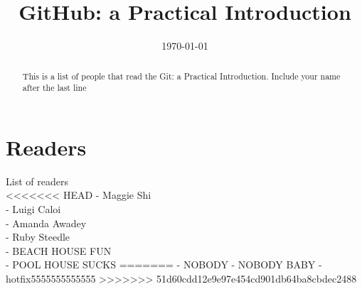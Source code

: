 \documentclass[12pt]{article}
\begin{document}
\title{GitHub: a Practical Introduction} 

\date{\today}

\maketitle 

\begin{abstract} 

	This is a list of people that read the Git: a Practical Introduction. Include your name after the last line
	
\end{abstract}

\section{Readers}
List of readers \\
<<<<<<< HEAD
- Maggie Shi \\
- Luigi Caloi  \\
- Amanda Awadey \\
- Ruby Steedle \\
- BEACH HOUSE FUN \\
- POOL HOUSE SUCKS
=======
- NOBODY
- NOBODY BABY
- hotfix5555555555555
>>>>>>> 51d60cdd12e9e97e454cd901db64ba8cbdec2488
	 
\end{document}
